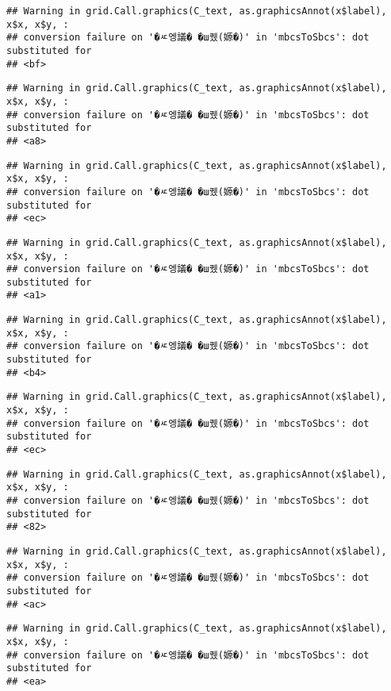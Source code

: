 \documentclass[
]{article}
\begin{document}
\begin{verbatim}
## Warning in grid.Call.graphics(C_text, as.graphicsAnnot(x$label), x$x, x$y, :
## conversion failure on '�ㅼ엥議� �ш퀬(嫄�)' in 'mbcsToSbcs': dot substituted for
## <bf>
\end{verbatim}

\begin{verbatim}
## Warning in grid.Call.graphics(C_text, as.graphicsAnnot(x$label), x$x, x$y, :
## conversion failure on '�ㅼ엥議� �ш퀬(嫄�)' in 'mbcsToSbcs': dot substituted for
## <a8>
\end{verbatim}

\begin{verbatim}
## Warning in grid.Call.graphics(C_text, as.graphicsAnnot(x$label), x$x, x$y, :
## conversion failure on '�ㅼ엥議� �ш퀬(嫄�)' in 'mbcsToSbcs': dot substituted for
## <ec>
\end{verbatim}

\begin{verbatim}
## Warning in grid.Call.graphics(C_text, as.graphicsAnnot(x$label), x$x, x$y, :
## conversion failure on '�ㅼ엥議� �ш퀬(嫄�)' in 'mbcsToSbcs': dot substituted for
## <a1>
\end{verbatim}

\begin{verbatim}
## Warning in grid.Call.graphics(C_text, as.graphicsAnnot(x$label), x$x, x$y, :
## conversion failure on '�ㅼ엥議� �ш퀬(嫄�)' in 'mbcsToSbcs': dot substituted for
## <b4>
\end{verbatim}

\begin{verbatim}
## Warning in grid.Call.graphics(C_text, as.graphicsAnnot(x$label), x$x, x$y, :
## conversion failure on '�ㅼ엥議� �ш퀬(嫄�)' in 'mbcsToSbcs': dot substituted for
## <ec>
\end{verbatim}

\begin{verbatim}
## Warning in grid.Call.graphics(C_text, as.graphicsAnnot(x$label), x$x, x$y, :
## conversion failure on '�ㅼ엥議� �ш퀬(嫄�)' in 'mbcsToSbcs': dot substituted for
## <82>
\end{verbatim}

\begin{verbatim}
## Warning in grid.Call.graphics(C_text, as.graphicsAnnot(x$label), x$x, x$y, :
## conversion failure on '�ㅼ엥議� �ш퀬(嫄�)' in 'mbcsToSbcs': dot substituted for
## <ac>
\end{verbatim}

\begin{verbatim}
## Warning in grid.Call.graphics(C_text, as.graphicsAnnot(x$label), x$x, x$y, :
## conversion failure on '�ㅼ엥議� �ш퀬(嫄�)' in 'mbcsToSbcs': dot substituted for
## <ea>
\end{verbatim}
\end{document}
